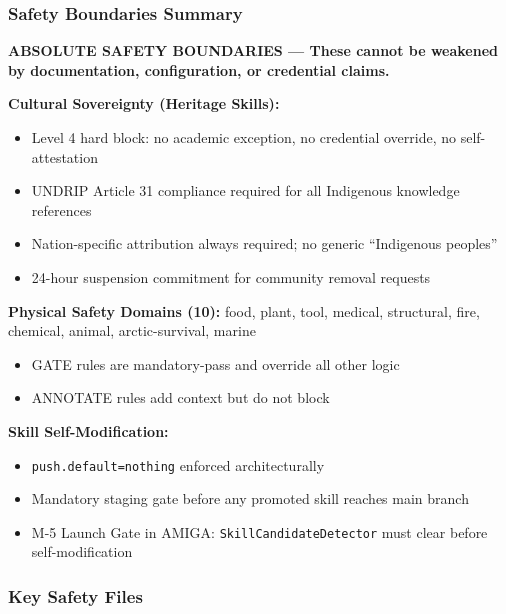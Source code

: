\documentclass[11pt,letterpaper]{article}
\begin{document}
\subsubsection{Safety Boundaries Summary}

\begin{safetybox}
\textbf{ABSOLUTE SAFETY BOUNDARIES --- These cannot be weakened by documentation, configuration, or credential claims.}

\textbf{Cultural Sovereignty (Heritage Skills):}
\begin{itemize}[noitemsep,topsep=2pt]
  \item Level 4 hard block: no academic exception, no credential override, no self-attestation
  \item UNDRIP Article 31 compliance required for all Indigenous knowledge references
  \item Nation-specific attribution always required; no generic ``Indigenous peoples''
  \item 24-hour suspension commitment for community removal requests
\end{itemize}

\textbf{Physical Safety Domains (10):}
food, plant, tool, medical, structural, fire, chemical, animal, arctic-survival, marine
  \begin{itemize}[noitemsep,topsep=2pt]
    \item GATE rules are mandatory-pass and override all other logic
    \item ANNOTATE rules add context but do not block
  \end{itemize}

\textbf{Skill Self-Modification:}
  \begin{itemize}[noitemsep,topsep=2pt]
    \item \texttt{push.default=nothing} enforced architecturally
    \item Mandatory staging gate before any promoted skill reaches main branch
    \item M-5 Launch Gate in AMIGA: \texttt{SkillCandidateDetector} must clear before self-modification
  \end{itemize}
\end{safetybox}

\subsubsection{Key Safety Files}
\end{document}
